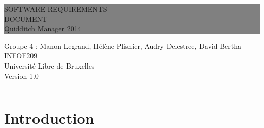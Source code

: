\documentclass[a4paper,titlepage]{scrreprt}
\newcommand{\HRule}[1]{\hfill \rule{0.2\linewidth}{#1}} %
\begin{document}
\renewcommand{\glossaryname}{ }

\renewcommand{\indexname}{4 Index}




\thispagestyle{empty} %


\colorbox{grey}{
	\parbox[t]{1.0\linewidth}{
		\centering \fontsize{50pt}{80pt}\selectfont %
		\vspace*{0.7cm} %
		
		\hfill SOFTWARE REQUIREMENTS \\
		\hfill DOCUMENT \\
		\hfill Quidditch Manager 2014\par
		
		\vspace*{0.7cm} %
	}
}


\vfill %


{\centering \large 
\hfill Groupe 4 : Manon Legrand, Hélène Plisnier, Audry Delestree, David Bertha \\
\hfill INFOF209 \\
\hfill Université Libre de Bruxelles \\
\hfill Version 1.0 \\

\HRule{1pt}} %


\clearpage %

\tableofcontents
\chapter{Introduction}
\end{document}
